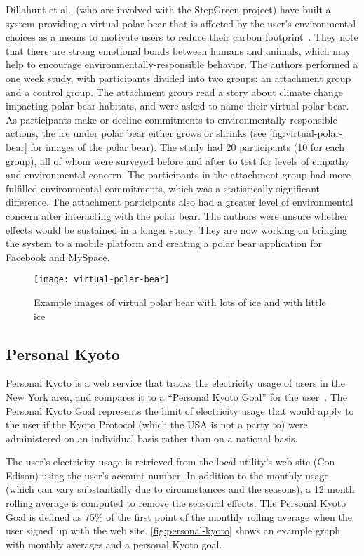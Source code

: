 Dillahunt et al.\ (who are involved with the StepGreen project) have built a system providing a virtual polar bear that is affected by the user's environmental choices as a means to motivate users to reduce their carbon footprint~\cite{dillahunt-virtual-polar-bear-2008}. They note that there are strong emotional bonds between humans and animals, which may help to encourage environmentally-responsible behavior. The authors performed a one week study, with participants divided into two groups: an attachment group and a control group. The attachment group read a story about climate change impacting polar bear habitats, and were asked to name their virtual polar bear. As participants make or decline commitments to environmentally responsible actions, the ice under polar bear either grows or shrinks (see \autoref{fig:virtual-polar-bear} for images of the polar bear). The study had 20 participants (10 for each group), all of whom were surveyed before and after to test for levels of empathy and environmental concern. The participants in the attachment group had more fulfilled environmental commitments, which was a statistically significant difference. The attachment participants also had a greater level of environmental concern after interacting with the polar bear. The authors were unsure whether effects would be sustained in a longer study. They are now working on bringing the system to a mobile platform and creating a polar bear application for Facebook and MySpace.

\begin{figure}[htbp]
	\centering
		\texttt{[image: virtual-polar-bear]}
		\caption{Example images of virtual polar bear with lots of ice and with little ice}
		\label{fig:virtual-polar-bear}
\end{figure}


\subsection{Personal Kyoto}
\label{sec:personal-kyoto}

Personal Kyoto is a web service that tracks the electricity usage of users in the New York area, and compares it to a ``Personal Kyoto Goal'' for the user~\cite{Personal-Kyoto-website}. The Personal Kyoto Goal represents the limit of electricity usage that would apply to the user if the Kyoto Protocol (which the USA is not a party to) were administered on an individual basis rather than on a national basis.

The user's electricity usage is retrieved from the local utility's web site (Con Edison) using the user's account number. In addition to the monthly usage (which can vary substantially due to circumstances and the seasons), a 12 month rolling average is computed to remove the seasonal effects. The Personal Kyoto Goal is defined as 75\% of the first point of the monthly rolling average when the user signed up with the web site. \autoref{fig:personal-kyoto} shows an example graph with monthly averages and a personal Kyoto goal.

